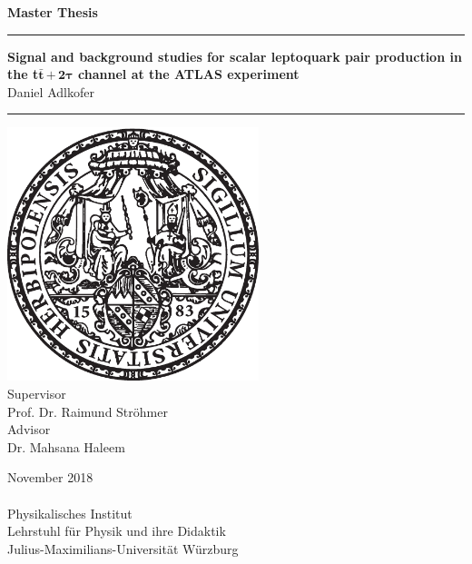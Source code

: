 \begin{titlepage}
\vspace*{-7\baselineskip} 
	\enlargethispage{100mm}
		\begin{center}
		\LARGE{\textbf{Master Thesis}\\}
		\vspace{6mm}	
		\textcolor{royalazure}{\noindent\rule{\textwidth}{3pt}}
		\huge{\textbf{Signal and background studies for scalar leptoquark pair production in the t$\bar{\textbf{t}}\,\mathbf{+\,2\tau}$ channel at the ATLAS experiment}\\}
		\vspace{6mm}
		\Large{Daniel Adlkofer\\}
		\textcolor{royalazure}{\noindent\rule{\textwidth}{3pt}}
		\vspace{6mm}
        \includegraphics[width=0.55\textwidth]{figures/neuSIEGEL.eps} \\
		\vspace{6mm}
		Supervisor \\
		\Large{Prof. Dr. Raimund Ströhmer\\}
               	\vspace{6mm}
                Advisor \\
    \Large{Dr. Mahsana Haleem\\}
               	\vspace{6mm}

		\vspace{4mm}
		November 2018\\
		  \noindent\hrulefill\\
		\vspace{4mm}
 		Physikalisches Institut\\
 		Lehrstuhl für Physik und ihre Didaktik\\
	    Julius-Maximilians-Universität Würzburg
	\end{center}
\end{titlepage}

\cleardoubleoddemptypage
